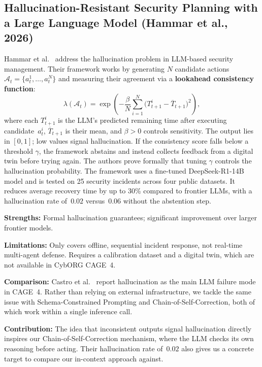 \documentclass[letterpaper, 10 pt, conference]{ieeeconf}
\begin{document}
\subsection{\textbf{Hallucination-Resistant Security Planning with a
            Large Language Model (Hammar et al., 2026)}}
 
Hammar et al.~\cite{arXiv:2602.05279} address the hallucination
problem in LLM-based security management. Their framework
works by generating $N$ candidate actions
$\mathcal{A}_t = \{a^1_t, \ldots, a^N_t\}$ and measuring their
agreement via a \textbf{lookahead consistency function}:
\begin{equation}
\label{eq:consistency}
  \lambda(\mathcal{A}_t) = \exp\!\left(
    -\frac{\beta}{N}\sum_{i=1}^{N}
    \bigl(T^i_{t+1} - \overline{T}_{t+1}\bigr)^2
  \right),
\end{equation}
where each $T^i_{t+1}$ is the LLM's predicted remaining time after
executing candidate~$a^i_t$,
$\overline{T}_{t+1}$ is their mean, and $\beta>0$ controls
sensitivity. The output lies in $[0,1]$; low values signal
hallucination. If the consistency
score falls below a threshold $\gamma$, the framework abstains
and instead collects feedback from a digital twin before trying
again. The authors prove formally that tuning $\gamma$
controls the hallucination probability. The framework uses a
fine-tuned DeepSeek-R1-14B model and is tested on 25 security
incidents across four public datasets. It reduces average
recovery time by up to 30\% compared to frontier LLMs, with
a hallucination rate of~$0.02$ versus~$0.06$ without the
abstention step.
 
\textbf{Strengths:} Formal hallucination guarantees;
significant improvement over larger frontier models.
 
\textbf{Limitations:} Only covers offline, sequential incident
response, not real-time multi-agent defense. Requires a
calibration dataset and a digital twin, which are not available
in CybORG CAGE~4.
 
\textbf{Comparison:} Castro et al.~\cite{arXiv:2505.04843v2}
report hallucination as the main LLM failure mode in CAGE~4.
Rather than relying on external infrastructure, we tackle the
same issue with Schema-Constrained Prompting and
Chain-of-Self-Correction, both of which work within a single
inference call.
 
\textbf{Contribution:} The idea that inconsistent outputs
signal hallucination directly inspires our
Chain-of-Self-Correction mechanism, where the LLM checks its
own reasoning before acting. Their hallucination rate
of~$0.02$ also gives us a concrete target to compare our
in-context approach against.
 
\end{document}
